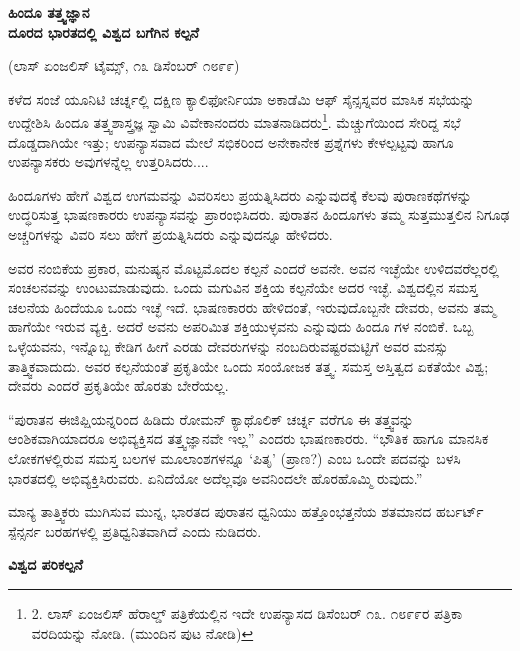 \begin{center}
\textbf{ಹಿಂದೂ ತತ್ತ್ವಜ್ಞಾನ\\ದೂರದ ಭಾರತದಲ್ಲಿ ವಿಶ್ವದ ಬಗೆಗಿನ ಕಲ್ಪನೆ }
\end{center}

\begin{center}
(ಲಾಸ್ ಏಂಜಲಿಸ್ ಟೈಮ್ಸ್, ೧೩ ಡಿಸೆಂಬರ್ ೧೮೯೯)
\end{center}

ಕಳೆದ ಸಂಜೆ ಯೂನಿಟಿ ಚರ್ಚ್ನಲ್ಲಿ ದಕ್ಷಿಣ ಕ್ಯಾಲಿಫೋರ್ನಿಯಾ ಅಕಾಡೆಮಿ ಆಫ್ ಸೈನ್ಸಸ್ನವರ ಮಾಸಿಕ ಸಭೆಯನ್ನು ಉದ್ದೇಶಿಸಿ ಹಿಂದೂ ತತ್ತ್ವಶಾಸ್ತ್ರಜ್ಞ ಸ್ವಾಮಿ ವಿವೇಕಾನಂದರು ಮಾತನಾಡಿದರು\footnote{2. ಲಾಸ್ ಏಂಜಲಿಸ್ ಹೆರಾಲ್ಡ್ ಪತ್ರಿಕೆಯಲ್ಲಿನ ಇದೇ ಉಪನ್ಯಾಸದ ಡಿಸೆಂಬರ್ ೧೩. ೧೮೯೯ರ ಪತ್ರಿಕಾ ವರದಿಯನ್ನು ನೋಡಿ. (ಮುಂದಿನ ಪುಟ ನೋಡಿ)}. ಮೆಚ್ಚುಗೆಯಿಂದ ಸೇರಿದ್ದ ಸಭೆ ದೊಡ್ಡದಾಗಿಯೇ ಇತ್ತು; ಉಪನ್ಯಾಸವಾದ ಮೇಲೆ ಸಭಿಕರಿಂದ ಅನೇಕಾನೇಕ ಪ್ರಶ್ನೆಗಳು ಕೇಳಲ್ಪಟ್ಟವು ಹಾಗೂ ಉಪನ್ಯಾಸಕರು ಅವುಗಳನ್ನೆಲ್ಲ ಉತ್ತರಿಸಿದರು....

ಹಿಂದೂಗಳು ಹೇಗೆ ವಿಶ್ವದ ಉಗಮವನ್ನು ವಿವರಿಸಲು ಪ್ರಯತ್ನಿಸಿದರು ಎನ್ನುವುದಕ್ಕೆ ಕೆಲವು ಪುರಾಣಕಥೆಗಳನ್ನು ಉದ್ಧರಿಸುತ್ತ ಭಾಷಣಕಾರರು ಉಪನ್ಯಾಸವನ್ನು ಪ್ರಾರಂಭಿಸಿದರು. ಪುರಾತನ ಹಿಂದೂಗಳು ತಮ್ಮ ಸುತ್ತಮುತ್ತಲಿನ ನಿಗೂಢ ಅಚ್ಚರಿಗಳನ್ನು ವಿವರಿ ಸಲು ಹೇಗೆ ಪ್ರಯತ್ನಿಸಿದರು ಎನ್ನುವುದನ್ನೂ ಹೇಳಿದರು.

ಅವರ ನಂಬಿಕೆಯ ಪ್ರಕಾರ, ಮನುಷ್ಯನ ಮೊಟ್ಟಮೊದಲ ಕಲ್ಪನೆ ಎಂದರೆ ಅವನೇ. ಅವನ ಇಚ್ಛೆಯೇ ಉಳಿದವರೆಲ್ಲರಲ್ಲಿ ಸಂಚಲನವನ್ನು ಉಂಟುಮಾಡುವುದು. ಒಂದು ಮಗುವಿನ ಶಕ್ತಿಯ ಕಲ್ಪನೆಯೇ ಅದರ ಇಚ್ಛೆ. ವಿಶ್ವದಲ್ಲಿನ ಸಮಸ್ತ ಚಲನೆಯ ಹಿಂದೆಯೂ ಒಂದು ಇಚ್ಛೆ ಇದೆ. ಭಾಷಣಕಾರರು ಹೇಳಿದಂತೆ, ಇರುವುದೊಬ್ಬನೇ ದೇವರು, ಅವನು ತಮ್ಮ ಹಾಗೆಯೇ ಇರುವ ವ್ಯಕ್ತಿ. ಅದರೆ ಅವನು ಅಪರಿಮಿತ ಶಕ್ತಿಯುಳ್ಳವನು ಎನ್ನುವುದು ಹಿಂದೂ ಗಳ ನಂಬಿಕೆ. ಒಬ್ಬ ಒಳ್ಳೆಯವನು, ಇನ್ನೊಬ್ಬ ಕೇಡಿಗ ಹೀಗೆ ಎರಡು ದೇವರುಗಳನ್ನು ನಂಬದಿರುವಷ್ಟರಮಟ್ಟಿಗೆ ಅವರ ಮನಸ್ಸು ತಾತ್ತ್ವಿಕವಾದುದು. ಅವರ ಕಲ್ಪನೆಯಂತೆ ಪ್ರಕೃತಿಯೇ ಒಂದು ಸಂಯೋಜಕ ತತ್ತ್ವ. ಸಮಸ್ತ ಅಸ್ತಿತ್ವದ ಏಕತೆಯೇ ವಿಶ್ವ; ದೇವರು ಎಂದರೆ ಪ್ರಕೃತಿಯೇ ಹೊರತು ಬೇರೆಯಲ್ಲ.

“ಪುರಾತನ ಈಜಿಪ್ಷಿಯನ್ನರಿಂದ ಹಿಡಿದು ರೋಮನ್ ಕ್ಯಾಥೊಲಿಕ್ ಚರ್ಚ್ನ ವರೆಗೂ ಈ ತತ್ತ್ವವನ್ನು ಆಂಶಿಕವಾಗಿಯಾದರೂ ಅಭಿವ್ಯಕ್ತಿಸದ ತತ್ತ್ವಜ್ಞಾನವೇ ಇಲ್ಲ” ಎಂದರು ಭಾಷಣಕಾರರು. “ಭೌತಿಕ ಹಾಗೂ ಮಾನಸಿಕ ಲೋಕಗಳಲ್ಲಿರುವ ಸಮಸ್ತ ಬಲಗಳ ಮೂಲಾಂಶಗಳನ್ನೂ ‘ಪಿತೃ’ (ಪ್ರಾಣ?) ಎಂಬ ಒಂದೇ ಪದವನ್ನು ಬಳಸಿ ಭಾರತದಲ್ಲಿ ಅಭಿವ್ಯಕ್ತಿಸಿರುವರು. ಏನಿದೆಯೋ ಅದೆಲ್ಲವೂ ಅವನಿಂದಲೇ ಹೊರಹೊಮ್ಮಿ ರುವುದು.”

ಮಾನ್ಯ ತಾತ್ತ್ವಿಕರು ಮುಗಿಸುವ ಮುನ್ನ, ಭಾರತದ ಪುರಾತನ ಧ್ವನಿಯು ಹತ್ತೊಂಭತ್ತನೆಯ ಶತಮಾನದ ಹರ್ಬರ್ಟ್ ಸ್ಪೆನ್ಸರ್ನ ಬರಹಗಳಲ್ಲಿ ಪ್ರತಿಧ್ವನಿತವಾಗಿದೆ ಎಂದು ನುಡಿದರು.

\begin{center}
\textbf{ವಿಶ್ವದ ಪರಿಕಲ್ಪನೆ}
\end{center}

